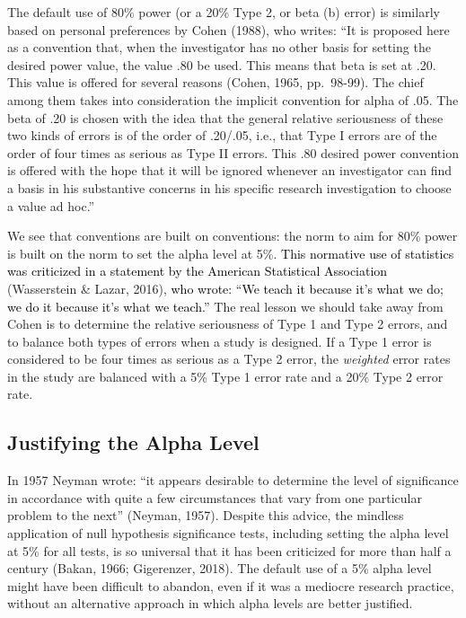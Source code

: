 \documentclass[
  english,
  ,man, a4paper,floatsintext]{apa6}
\begin{document}
The default use of 80\% power (or a 20\% Type 2, or beta (b) error) is similarly based on personal preferences by Cohen (1988), who writes: ``It is proposed here as a convention that, when the investigator has no other basis for setting the desired power value, the value .80 be used. This means that beta is set at .20. This value is offered for several reasons (Cohen, 1965, pp.~98-99). The chief among them takes into consideration the implicit convention for alpha of .05. The beta of .20 is chosen with the idea that the general relative seriousness of these two kinds of errors is of the order of .20/.05, i.e., that Type I errors are of the order of four times as serious as Type II errors. This .80 desired power convention is offered with the hope that it will be ignored whenever an investigator can find a basis in his substantive concerns in his specific research investigation to choose a value ad hoc.''

We see that conventions are built on conventions: the norm to aim for 80\% power is built on the norm to set the alpha level at 5\%. \textcolor{black}{This normative use of statistics was criticized in a statement by the American Statistical Association} (Wasserstein \& Lazar, 2016), \textcolor{black}{who wrote: ``We teach it because it’s what we do; we do it because it’s what we teach.''} The real lesson we should take away from Cohen is to determine the relative seriousness of Type 1 and Type 2 errors, and to balance both types of errors when a study is designed. If a Type 1 error is considered to be four times as serious as a Type 2 error, the \emph{weighted} error rates in the study are balanced with a 5\% Type 1 error rate and a 20\% Type 2 error rate.

\hypertarget{justifying-the-alpha-level}{%
\subsection{Justifying the Alpha Level}\label{justifying-the-alpha-level}}

In 1957 Neyman wrote: ``it appears desirable to determine the level of significance in accordance with quite a few circumstances that vary from one particular problem to the next'' (Neyman, 1957). Despite this advice, the mindless application of null hypothesis significance tests, including setting the alpha level at 5\% for all tests, is so universal that it has been criticized for more than half a century (Bakan, 1966; Gigerenzer, 2018). The default use of a 5\% alpha level might have been difficult to abandon, even if it was a mediocre research practice, without an alternative approach in which alpha levels are better justified.
\end{document}
